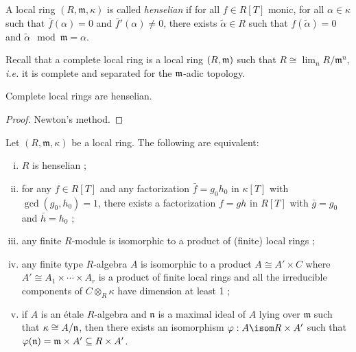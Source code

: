 
\begin{defi}
A local ring $(R, \mathfrak m, \kappa)$ is called \emph{henselian} if for all $f\in R[T]$ monic, for all $\alpha\in \kappa$ such that $\bar f(\alpha)=0$ and $\bar f'(\alpha)\neq 0$, there exists $\tilde\alpha\in R$ such that $f(\tilde\alpha) = 0$ and $\tilde\alpha\mod\mathfrak m = \alpha$. 
\end{defi} 

Recall that a complete local ring is a local ring $(R, \frak m)$ such that  $R\cong \lim_n R/\mathfrak m^n$, {\it i.e.} it is complete and separated for the $\frak m$-adic topology.

\begin{thm}
Complete local rings are henselian.
\end{thm}

\begin{proof}
Newton's method.
\end{proof}

\begin{thm} \label{thm:eqDefHenselian}
Let $(R, \mathfrak m, \kappa)$ be a local ring. The following are equivalent:
\begin{enumerate}[i.]
\item $R$ is henselian ;
\item for any $f\in R[T]$ and any factorization $\bar f = g_0 h_0$ in $\kappa[T]$ with $\gcd(g_0,h_0)=1$, there exists a factorization $f=gh$ in $R[T]$ with $\bar g = g_0$ and $\bar h=h_0$ ;
\item any finite $R$-module is isomorphic to a product of (finite) local rings ;
\item any finite type $R$-algebra $A$ is isomorphic to a product $A \cong A' \times C$ where $A' \cong A_1 \times \cdots \times A_r$ is a product of finite local rings and all the irreducible components of $C\otimes_R\kappa$ have dimension at least 1 ;
\item if $A$ is an \'etale $R$-algebra and $\mathfrak n$ is a maximal ideal of $A$ lying over $\mathfrak m$ such that $\kappa \cong A/\frak n$, then there exists an isomorphism $\varphi: A \isom R\times A'$ such that $\varphi(\frak n) = \frak m \times A'\subseteq R\times A'$.
\end{enumerate}
\end{thm}

